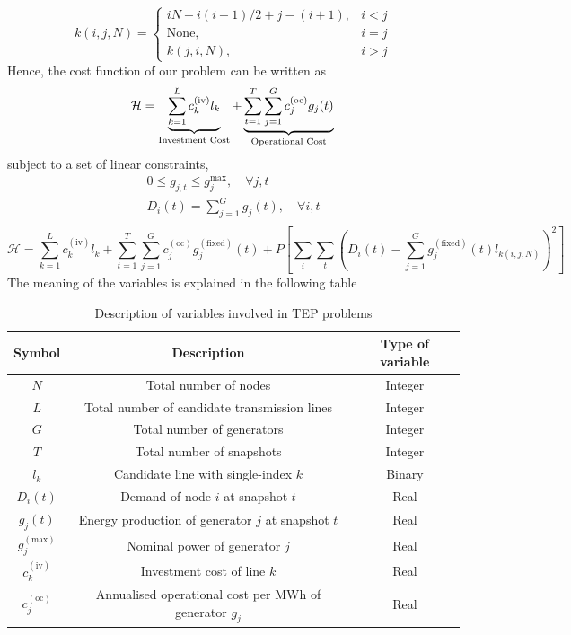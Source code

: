 \begin{equation}
k(i,j,N) = \begin{cases}
    iN - i\left(i+1\right)/2 + j - (i+1), & i<j\\
    \text{None},& i=j \\
    k(j,i,N), & i>j
\end{cases}
    \label{eq: TwoIndexesmap}
\end{equation}
Hence, the cost function of our problem can be written as
\begin{equation}
\label{eq: Objective}
    \mathcal{H} = \underbrace{\sum_{k=1}^{L}c_{k}^{(\text{iv})}l_{k}}_{\text{Investment Cost}} + \underbrace{\sum_{t=1}^{T}\sum_{j=1}^{G}c_{j}^{(\text{oc})}g_{j}(t)}_{\text{Operational Cost}}\\ 
\end{equation}
subject to a set of linear constraints,
\begin{align}
    0 \leq g_{j,t}\leq g_{j}^{\max},\quad \forall j,t \\
    D_{i}(t) =\sum_{j=1}^{G}g_{j}(t), \quad \forall i,t \\
\end{align}
\begin{equation}
    \mathcal{H} = \sum_{k=1}^{L}c_{k}^{(\text{iv})}l_{k} + \sum_{t=1}^{T}\sum_{j=1}^{G}c_{j}^{(\text{oc})}g_{j}^{(\text{fixed})}(t) + P\left[\sum_{i}\sum_{t}\left(D_{i}(t) - \sum_{j=1}^{G}g_{j}^{(\text{fixed})}(t)l_{k(i,j,N)}\right)^{2}\right]
\end{equation}
The meaning of the variables is explained in the following table
\begin{table}[H]
\centering
\begin{tabular}{|c||c|c|} 
 \hline	
 \textbf{Symbol} & \textbf{Description} & \textbf{Type of variable} \\
 \hline	
 $N$ & Total number of nodes & Integer\\
  \hline	
 $L$ & Total number of candidate transmission lines & Integer\\
  \hline	
 $G$ & Total number of generators & Integer\\
  \hline	
 $T$ & Total number of snapshots & Integer\\
  \hline	
 $l_{k}$ & Candidate line with single-index $k$ & Binary\\
  \hline	
 $D_{i}(t)$ & Demand of node $i$ at snapshot $t$ & Real\\
  \hline	
 $g_{j}(t)$ & Energy production of generator $j$ at snapshot $t$ & Real\\
  \hline	
 $g_{j}^{(\text{max})}$ & Nominal power of generator $j$ & Real\\
  \hline	
 $c_{k}^{(\text{iv})}$ & Investment cost of line $k$ & Real\\
  \hline	
  $c_{j}^{(\text{oc})}$ & Annualised operational cost per MWh of generator $g_{j}$ & Real\\
  \hline
\end{tabular}
\caption{Description of variables involved in TEP problems}
\label{table:TEPNomenclature}
\end{table}
